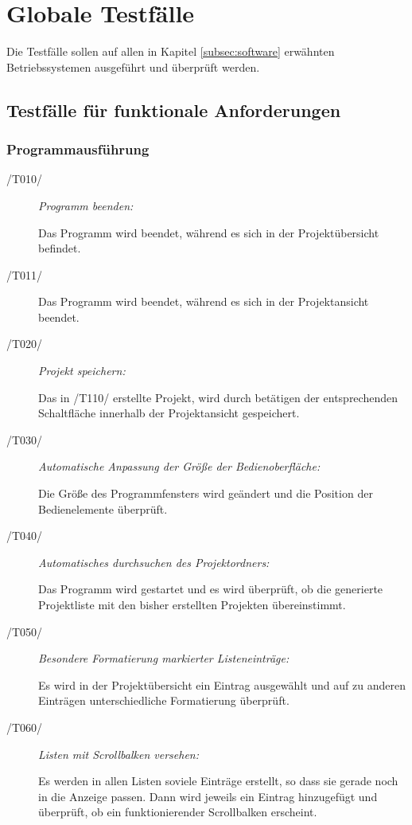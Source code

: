 \section{Globale Testfälle}

Die Testfälle sollen auf allen in Kapitel \ref{subsec:software} erwähnten Betriebssystemen ausgeführt und überprüft werden.


\subsection{Testfälle für funktionale Anforderungen}
	
	\subsubsection{Programmausführung}
	
		\begin{description}

			\item[/T010/] \textit{Programm beenden:}\par Das Programm wird beendet, während es sich in der Projektübersicht befindet.
			
			\item[/T011/] Das Programm wird beendet, während es sich in der Projektansicht beendet.
				
			\item[/T020/] \textit{Projekt speichern:}\par Das in /T110/ erstellte Projekt, wird durch betätigen der entsprechenden Schaltfläche innerhalb der Projektansicht gespeichert. 
				
			\item[/T030/] \textit{Automatische Anpassung der Größe der Bedienoberfläche:}\par Die Größe des Programmfensters wird geändert und die Position der Bedienelemente überprüft.
			
			\item[/T040/] \textit{Automatisches durchsuchen des Projektordners:}\par Das Programm wird gestartet und es wird überprüft, ob die generierte Projektliste mit den bisher erstellten Projekten übereinstimmt.
		
			\item[/T050/] \textit{Besondere Formatierung markierter Listeneinträge:}\par Es wird in der Projektübersicht ein Eintrag ausgewählt und auf zu anderen Einträgen unterschiedliche Formatierung überprüft.
			
			\item[/T060/] \textit{Listen mit Scrollbalken versehen:}\par Es werden in allen Listen soviele Einträge erstellt, so dass sie gerade noch in die Anzeige passen. Dann wird jeweils ein Eintrag hinzugefügt und überprüft, ob ein funktionierender Scrollbalken erscheint.
			
		\end{description}

